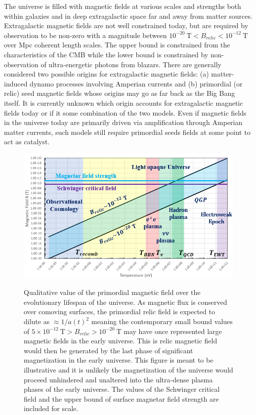 \documentclass[Universe,article,submit,moreauthors,pdftex]{Definitions/mdpi}
\begin{document}
The universe is filled with magnetic fields at various scales and strengths both within galaxies and in deep extragalactic space far and away from matter sources. Extragalactic magnetic fields are not well constrained today, but are required by observation to be non-zero with a magnitude between $10^{-20}\ \mathrm{T}<B_{relic}<10^{-12}\ \mathrm{T}$ over Mpc coherent length scales. The upper bound is constrained from the characteristics of the CMB while the lower bound is constrained by non-observation of ultra-energetic photons from blazars. There are generally considered two possible origins for extragalactic magnetic fields: (a) matter-induced dynamo processes involving Amperian currents and (b) primordial (or relic) seed magnetic fields whose origins may go as far back as the Big Bang itself. It is currently unknown which origin accounts for extragalactic magnetic fields today or if it some combination of the two models. Even if magnetic fields in the universe today are primarily driven via amplification through Amperian matter currents, such models still require primordial seeds fields at some point to act as catalyst.
\begin{figure}[t]
  \includegraphics[scale=0.75]{relic_plot.PNG}
  \label{fig1}
  \caption{Qualitative value of the primordial magnetic field over the evolutionary lifespan of the universe. As magnetic flux is conserved over comoving surfaces, the primordial relic field is expected to dilute as $\approx1/a(t)^{2}$ meaning the contemporary small bound values of $5\times10^{-12}\ \mathrm{T}>B_{relic}>10^{-20}\ \mathrm{T}$ may have once represented large magnetic fields in the early universe. This is relic magnetic field would then be generated by the last phase of significant magnetization in the early universe. This figure is meant to be illustrative and it is unlikely the magnetization of the universe would proceed unhindered and unaltered into the ultra-dense plasma phases of the early universe. The values of the Schwinger critical field and the upper bound of surface magnetar field strength are included for scale.}
  \centering
\end{figure}
\end{document}
